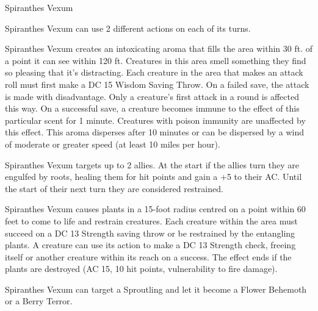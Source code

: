 \begin{DndMonster}[width=0.5\textwidth]{Spiranthes Vexum}
	
	Spiranthes Vexum can use 2 different actions on each of its turns.
	
	\DndMonsterAttack[
      name=Vine Slam,
      distance=melee, %
      mod=+8,
      reach=5,
      targets=one target that is grappled by Spiranthes Vexum,
      dmg=\DndDice{2d8 + 5},
      dmg-type=bludgeoning,
      extra={. The grappled target can make a DC 12 Strength Saving Throw to free itself from the grapple after this attack},
    ]
      
    Spiranthes Vexum creates an intoxicating aroma that fills the area within 30 ft. of a point it can see within 120 ft. Creatures in this area smell something they find so pleasing that it's distracting. Each creature in the area that makes an attack roll must first make a DC 15 Wisdom Saving Throw. On a failed save, the attack is made with disadvantage. Only a creature's first attack in a round is affected this way. On a successful save, a creature becomes immune to the effect of this particular scent for 1 minute. Creatures with poison immunity are unaffected by this effect. This aroma disperses after 10 minutes or can be dispersed by a wind of moderate or greater speed  (at least 10 miles per hour).
    
    Spiranthes Vexum targets up to 2 allies. At the start if the allies turn they are engulfed by roots, healing them for  hit points and gain a +5 to their AC. Until the start of their next turn they are considered restrained.
    
	Spiranthes Vexum causes plants in a 15-foot radius centred on a point within 60 feet to come to life and restrain creatures. Each creature within the area must succeed on a DC 13 Strength saving throw or be restrained by the entangling plants. A creature can use its action to make a DC 13 Strength check, freeing itself or another creature within its reach on a success. The effect ends if the plants are destroyed (AC 15, 10 hit points, vulnerability to fire damage).
    
    Spiranthes Vexum can target a Sproutling and let it become a Flower Behemoth or a Berry Terror.
\end{DndMonster}
	
